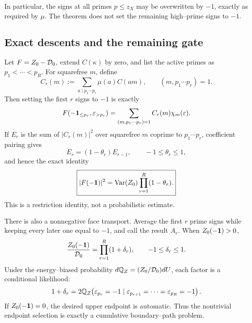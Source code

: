 In particular, the signs at all primes \(p\le z_X\) may be overwritten
by \(-1\), exactly as required by \(\mu\).  The theorem does not set the
remaining high--prime signs to \(-1\).

\subsection{Exact descents and the remaining gate}

Let \(F=Z_0-\mathcal D_0\), extend \(C(\kappa)\) by zero, and list the active
primes as \(p_1<\cdots<p_R\).  For squarefree \(m\), define
\begin{equation}
 C_r(m):=\sum_{a\mid p_1\cdots p_r}\mu(a)C(am),
 \qquad (m,p_1\cdots p_r)=1.
 \label{eq:tpc44-intro-Cr}
\end{equation}
Then setting the first \(r\) signs to \(-1\) is exactly
\begin{equation}
 F(-\mathbf 1_{\le p_r},\varepsilon_{>p_r})
 =\sum_{(m,p_1\cdots p_r)=1}C_r(m)\chi_m(\varepsilon).
 \label{eq:tpc44-intro-restricted-F}
\end{equation}
If \(E_r\) is the sum of \(|C_r(m)|^2\) over squarefree \(m\) coprime to
\(p_1\cdots p_r\), coefficient pairing gives
\begin{equation}
 E_r=(1-\theta_r)E_{r-1},
 \qquad -1\le\theta_r\le1,
 \label{eq:tpc44-intro-energy-step}
\end{equation}
and hence the exact identity
\begin{equation}
 \boxed{
 |F(-\mathbf 1)|^2
 =\operatorname{Var}(Z_0)
  \prod_{r=1}^{R}(1-\theta_r).}
 \label{eq:tpc44-intro-coefficient-product}
\end{equation}
This is a restriction identity, not a probabilistic estimate.

There is also a nonnegative face transport.  Average the first \(r\)
prime signs while keeping every later one equal to \(-1\), and call the
result \(A_r\).  When \(Z_0(-\mathbf 1)>0\),
\begin{equation}
 \frac{Z_0(-\mathbf 1)}{\mathcal D_0}
 =\prod_{r=1}^{R}(1+\delta_r),
 \qquad -1\le\delta_r\le1.
 \label{eq:tpc44-intro-face-product}
\end{equation}
Under the energy--biased probability
\(d\mathbb Q_Z=(Z_0/\mathcal D_0)dU\), each factor is a conditional likelihood:
\begin{equation}
 1+\delta_r
 =2\mathbb Q_Z\!\left(
  \varepsilon_{p_r}=-1
  \mid
  \varepsilon_{p_{r+1}}=\cdots=\varepsilon_{p_R}=-1
 \right).
 \label{eq:tpc44-intro-likelihood}
\end{equation}
If \(Z_0(-\mathbf 1)=0\), the desired upper endpoint is automatic.  Thus the
nontrivial endpoint selection is exactly a cumulative boundary--path
problem.

